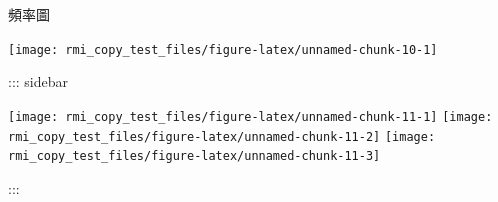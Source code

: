 \documentclass[]{book}
\newenvironment{Shaded}{\begin{snugshade}}{\end{snugshade}}
\newcommand{\KeywordTok}[1]{\textcolor[rgb]{0.13,0.29,0.53}{\textbf{#1}}}
\newcommand{\DecValTok}[1]{\textcolor[rgb]{0.00,0.00,0.81}{#1}}
\newcommand{\OperatorTok}[1]{\textcolor[rgb]{0.81,0.36,0.00}{\textbf{#1}}}
\newcommand{\NormalTok}[1]{#1}
\theoremstyle{definition}
\theoremstyle{definition}
\theoremstyle{definition}
\theoremstyle{remark}
\begin{document}
\begin{Shaded}
\end{Shaded}

頻率圖

\begin{Shaded}
\end{Shaded}

\begin{center}\texttt{[image: rmi\_copy\_test\_files/figure-latex/unnamed-chunk-10-1]} \end{center}

::: sidebar

\begin{Shaded}
\end{Shaded}

\begin{center}\texttt{[image: rmi\_copy\_test\_files/figure-latex/unnamed-chunk-11-1]} \texttt{[image: rmi\_copy\_test\_files/figure-latex/unnamed-chunk-11-2]} \texttt{[image: rmi\_copy\_test\_files/figure-latex/unnamed-chunk-11-3]} \end{center}

:::

\begin{Shaded}
\end{Shaded}
\end{document}
